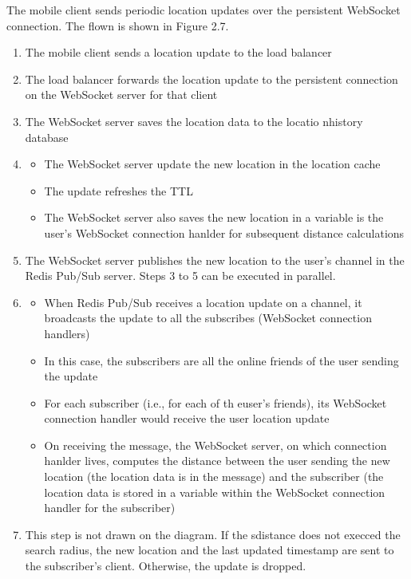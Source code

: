 \documentclass{report}
\theoremstyle{definition}
\begin{document}
The mobile client sends periodic location updates over the persistent WebSocket connection. The flown is shown in Figure 2.7.

\begin{enumerate}
\item
The mobile client sends a location update to the load balancer
\item
The load balancer forwards the location update to the persistent connection on the WebSocket server for that client
\item
The WebSocket server saves the location data to the locatio nhistory database
\item

\begin{itemize}
\item
The WebSocket server update the new location in the location cache
\item
The update refreshes the TTL
\item
The WebSocket server also saves the new location in a variable is the user's WebSocket connection hanlder for subsequent distance
calculations
\end{itemize}
\item
The WebSocket server publishes the new location to the user's channel in the Redis Pub/Sub server. Steps 3 to 5 can be executed in parallel.
\item

\begin{itemize}
\item
When Redis Pub/Sub receives a location update on a channel, it broadcasts the update to all the subscribes (WebSocket connection handlers)
\item
In this case, the subscribers are all the online friends of the user sending the update
\item
For each subscriber (i.e., for each of th euser's friends), its WebSocket connection handler would receive the user location update
\item
On receiving the message, the WebSocket server, on which connection hanlder lives, computes the distance between the user sending the new location (the location data is in the message) and the subscriber (the location data is stored in a variable within the WebSocket
connection handler for the subscriber)
\end{itemize}
\item
This step is not drawn on the diagram. If the sdistance does not execced the search radius, the new location and the last updated timestamp are sent to the subscriber's client. Otherwise, the update is dropped.
\end{enumerate}
\end{document}
